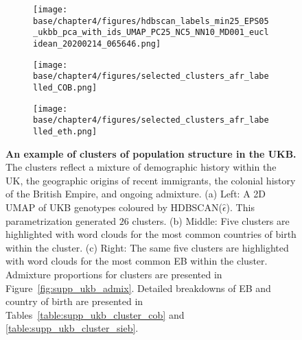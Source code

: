\begin{figure}[ht]
  \centering
  \begin{subfigure}[b]{0.3\linewidth}
    \texttt{[image: base/chapter4/figures/hdbscan\_labels\_min25\_EPS05\_ukbb\_pca\_with\_ids\_UMAP\_PC25\_NC5\_NN10\_MD001\_euclidean\_20200214\_065646.png]}
    \caption{}
    \label{fig:ukb_hdbscan_labels}
  \end{subfigure}
   \begin{subfigure}[b]{0.3\linewidth}
    \texttt{[image: base/chapter4/figures/selected\_clusters\_afr\_labelled\_COB.png]}
    \caption{}
    \label{fig:ukb_hdbscan_labels_cob}
  \end{subfigure}
     \begin{subfigure}[b]{0.3\linewidth}
    \texttt{[image: base/chapter4/figures/selected\_clusters\_afr\_labelled\_eth.png]}
    \caption{}
    \label{fig:ukb_hdbscan_labels_eth}
  \end{subfigure}
  \caption[Clusters of population structure in the UKB]{\textbf{An example of clusters of population structure in the UKB.} The clusters reflect a mixture of demographic history within the UK, the geographic origins of recent immigrants, the colonial history of the British Empire, and ongoing admixture. (a) Left: A 2D UMAP of UKB genotypes coloured by HDBSCAN($\hat{\epsilon}$). This parametrization generated $26$ clusters. (b) Middle: Five clusters are highlighted with word clouds for the most common countries of birth within the cluster. (c) Right: The same five clusters are highlighted with word clouds for the most common EB within the cluster. Admixture proportions for clusters are presented in Figure~\ref{fig:supp_ukb_admix}. Detailed breakdowns of EB and country of birth are presented in Tables~\ref{table:supp_ukb_cluster_cob} and \ref{table:supp_ukb_cluster_sieb}.}
  \label{fig:ukb_hdbscan_compare}
\end{figure}

